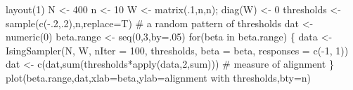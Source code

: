 \documentclass[
  a4paper,
  DIV=11,
  numbers=noendperiod,
  oneside]{scrreprt}
\newenvironment{Shaded}{}{}
\newcommand{\AttributeTok}[1]{\textcolor[rgb]{0.84,0.23,0.29}{#1}}
\newcommand{\CommentTok}[1]{\textcolor[rgb]{0.42,0.45,0.49}{#1}}
\newcommand{\ControlFlowTok}[1]{\textcolor[rgb]{0.84,0.23,0.29}{#1}}
\newcommand{\DecValTok}[1]{\textcolor[rgb]{0.00,0.36,0.77}{#1}}
\newcommand{\FunctionTok}[1]{\textcolor[rgb]{0.44,0.26,0.76}{#1}}
\newcommand{\NormalTok}[1]{\textcolor[rgb]{0.14,0.16,0.18}{#1}}
\newcommand{\OtherTok}[1]{\textcolor[rgb]{0.44,0.26,0.76}{#1}}
\newcommand{\SpecialCharTok}[1]{\textcolor[rgb]{0.00,0.36,0.77}{#1}}
\newcommand{\StringTok}[1]{\textcolor[rgb]{0.01,0.18,0.38}{#1}}
\begin{document}
\begin{Shaded}
\begin{Highlighting}[]
\FunctionTok{layout}\NormalTok{(}\DecValTok{1}\NormalTok{)}
\NormalTok{N }\OtherTok{\textless{}{-}} \DecValTok{400}
\NormalTok{n }\OtherTok{\textless{}{-}} \DecValTok{10}
\NormalTok{W }\OtherTok{\textless{}{-}} \FunctionTok{matrix}\NormalTok{(.}\DecValTok{1}\NormalTok{,n,n); }\FunctionTok{diag}\NormalTok{(W) }\OtherTok{\textless{}{-}} \DecValTok{0}
\NormalTok{thresholds }\OtherTok{\textless{}{-}} \FunctionTok{sample}\NormalTok{(}\FunctionTok{c}\NormalTok{(}\SpecialCharTok{{-}}\NormalTok{.}\DecValTok{2}\NormalTok{,.}\DecValTok{2}\NormalTok{),n,}\AttributeTok{replace=}\NormalTok{T) }\CommentTok{\# a random pattern of thresholds}
\NormalTok{dat }\OtherTok{\textless{}{-}} \FunctionTok{numeric}\NormalTok{(}\DecValTok{0}\NormalTok{)}
\NormalTok{beta.range }\OtherTok{\textless{}{-}} \FunctionTok{seq}\NormalTok{(}\DecValTok{0}\NormalTok{,}\DecValTok{3}\NormalTok{,}\AttributeTok{by=}\NormalTok{.}\DecValTok{05}\NormalTok{)}
\ControlFlowTok{for}\NormalTok{(beta }\ControlFlowTok{in}\NormalTok{ beta.range)}
\NormalTok{\{}
\NormalTok{data }\OtherTok{\textless{}{-}} \FunctionTok{IsingSampler}\NormalTok{(N, W, }\AttributeTok{nIter =} \DecValTok{100}\NormalTok{, thresholds, }
                     \AttributeTok{beta =}\NormalTok{ beta, }\AttributeTok{responses =} \FunctionTok{c}\NormalTok{(}\SpecialCharTok{{-}}\DecValTok{1}\NormalTok{, }\DecValTok{1}\NormalTok{))}
\NormalTok{dat }\OtherTok{\textless{}{-}} \FunctionTok{c}\NormalTok{(dat,}\FunctionTok{sum}\NormalTok{(thresholds}\SpecialCharTok{*}\FunctionTok{apply}\NormalTok{(data,}\DecValTok{2}\NormalTok{,sum))) }\CommentTok{\# measure of alignment}
\NormalTok{\}}
\FunctionTok{plot}\NormalTok{(beta.range,dat,}\AttributeTok{xlab=}\StringTok{\textquotesingle{}beta\textquotesingle{}}\NormalTok{,}\AttributeTok{ylab=}\StringTok{\textquotesingle{}alignment with thresholds\textquotesingle{}}\NormalTok{,}\AttributeTok{bty=}\StringTok{\textquotesingle{}n\textquotesingle{}}\NormalTok{)}
\end{Highlighting}
\end{Shaded}
\end{document}
